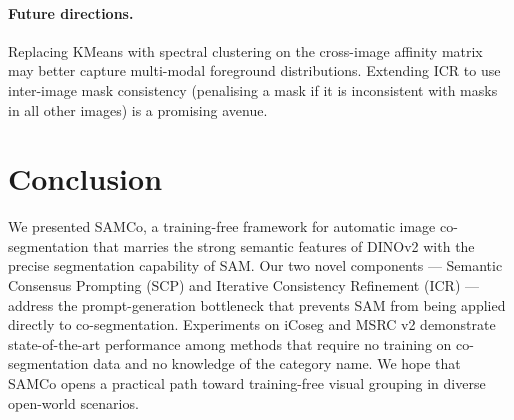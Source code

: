 \documentclass[10pt,twocolumn,letterpaper]{article}
\begin{document}
\paragraph{Future directions.}
Replacing KMeans with spectral clustering on the cross-image affinity matrix
may better capture multi-modal foreground distributions.
Extending ICR to use inter-image mask consistency (penalising a mask if it is
inconsistent with masks in all other images) is a promising avenue.

\section{Conclusion}
\label{sec:conclusion}

We presented SAMCo, a training-free framework for automatic image co-segmentation
that marries the strong semantic features of DINOv2 with the precise segmentation
capability of SAM.
Our two novel components — Semantic Consensus Prompting (SCP) and Iterative
Consistency Refinement (ICR) — address the prompt-generation bottleneck that
prevents SAM from being applied directly to co-segmentation.
Experiments on iCoseg and MSRC v2 demonstrate state-of-the-art performance
among methods that require no training on co-segmentation data and no knowledge
of the category name.
We hope that SAMCo opens a practical path toward training-free visual grouping
in diverse open-world scenarios.
\end{document}
